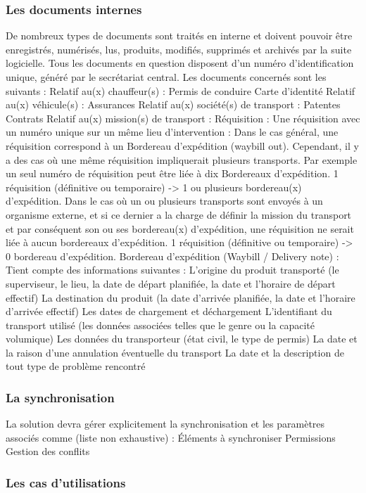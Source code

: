 \documentclass[11pt,fleqn]{book} %
\begin{document}
\subsubsection{Les documents internes}
De nombreux types de documents sont traités en interne et doivent pouvoir être enregistrés, numérisés, lus, produits, modifiés, supprimés et archivés par la suite logicielle. Tous les documents en question disposent d'un numéro d'identification unique, généré par le secrétariat central. Les documents concernés sont les suivants :
Relatif au(x) chauffeur(s) :
Permis de conduire
Carte d'identité
Relatif au(x) véhicule(s) :
Assurances
Relatif au(x) société(s) de transport :
Patentes
Contrats
Relatif au(x) mission(s) de transport :
Réquisition :
Une réquisition avec un numéro unique sur un même lieu d'intervention : Dans le cas général, une réquisition correspond à un Bordereau d'expédition (waybill out). Cependant, il y a des cas où une même réquisition impliquerait plusieurs transports. Par exemple un seul numéro de réquisition peut être liée à dix Bordereaux d'expédition. 1 réquisition (définitive ou temporaire) -> 1 ou plusieurs bordereau(x) d'expédition.
Dans le cas où un ou plusieurs transports sont envoyés à un organisme externe, et si ce dernier a la charge de définir la mission du transport et par conséquent son ou ses bordereau(x) d'expédition, une réquisition ne serait liée à aucun bordereaux d'expédition. 1 réquisition (définitive ou temporaire) -> 0 bordereau d'expédition.
Bordereau d'expédition (Waybill / Delivery note) :
Tient compte des informations suivantes :
L'origine du produit transporté (le superviseur, le lieu, la date de départ planifiée, la date et l'horaire de départ effectif)
La destination du produit (la date d'arrivée planifiée, la date et l'horaire d'arrivée effectif)
Les dates de chargement et déchargement
L'identifiant du transport utilisé (les données associées telles que le genre ou la capacité volumique) 
Les données du transporteur (état civil, le type de permis)
La date et la raison d'une annulation éventuelle du transport 
La date et la description de tout type de problème rencontré

\subsubsection{La synchronisation}
La solution devra gérer explicitement la synchronisation et les paramètres associés comme (liste non exhaustive) :
Éléments à synchroniser
Permissions
Gestion des conflits

\subsubsection{Les cas d'utilisations}
\end{document}
